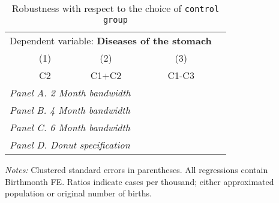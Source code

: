  \begin{table}[H] \begin{threeparttable} \centering \caption{Robustness with respect to the choice of \texttt{control group}} {\def\sym#1{\ifmmode^{#1}\else\(^{#1}\)\fi} \begin{tabular}{l*{4}{c}} \toprule \multicolumn{4}{c}{Dependent variable: \textbf{Diseases of the stomach}} \\ \cmidrule(lr){2-4}
            &\multicolumn{1}{c}{(1)}&\multicolumn{1}{c}{(2)}&\multicolumn{1}{c}{(3)}\\
            &\multicolumn{1}{c}{C2}&\multicolumn{1}{c}{C1+C2}&\multicolumn{1}{c}{C1-C3}\\
\midrule
 \multicolumn{4}{l}{\emph{Panel A. 2 Month bandwidth}} \\    \midrule\multicolumn{4}{l}{\emph{Panel B. 4 Month bandwidth}} \\    \midrule\multicolumn{4}{l}{\emph{Panel C. 6 Month bandwidth}} \\    \midrule\multicolumn{4}{l}{\emph{Panel D. Donut specification}} \\    
\bottomrule \end{tabular} } \begin{tablenotes} \item \scriptsize \emph{Notes:} Clustered standard errors in parentheses. All regressions contain Birthmonth FE. Ratios indicate cases per thousand; either approximated population or original number of births. \end{tablenotes} \end{threeparttable} \end{table} 
